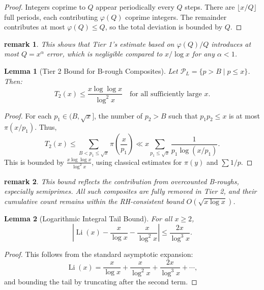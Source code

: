 \documentclass[11pt]{article}
\newtheorem{lemma}{Lemma}
\newtheorem{remark}{remark}
\begin{document}
	\begin{proof}
		Integers coprime to \( Q \) appear periodically every \( Q \) steps. There are \( \lfloor x / Q \rfloor \) full periods, each contributing \( \varphi(Q) \) coprime integers. The remainder contributes at most \( \varphi(Q) \le Q \), so the total deviation is bounded by \( Q \).
	\end{proof}
	
	\begin{remark}
		This shows that Tier 1’s estimate based on \( \varphi(Q)/Q \) introduces at most \( Q = x^\alpha \) error, which is negligible compared to \( x/\log x \) for any \( \alpha < 1 \).
	\end{remark}
	
	\begin{lemma}[Tier 2 Bound for B-rough Composites]
		Let \( \mathcal{P}_L = \{ p > B \mid p \le x \} \). Then:
		\[
		T_2(x) \le \frac{x \log \log x}{\log^2 x}
		\quad \text{for all sufficiently large } x.
		\]
	\end{lemma}
	
	\begin{proof}
		For each \( p_1 \in (B, \sqrt{x}] \), the number of \( p_2 > B \) such that \( p_1 p_2 \le x \) is at most \( \pi(x/p_1) \). Thus,
		\[
		T_2(x) \le \sum_{B < p_1 \le \sqrt{x}} \pi\left( \frac{x}{p_1} \right) \ll x \sum_{p_1 \le \sqrt{x}} \frac{1}{p_1 \log(x/p_1)}.
		\]
		This is bounded by \( \frac{x \log \log x}{\log^2 x} \), using classical estimates for \( \pi(y) \) and \( \sum 1/p \).
	\end{proof}
	
	\begin{remark}
		This bound reflects the contribution from overcounted B-roughs, especially semiprimes. All such composites are fully removed in Tier 2, and their cumulative count remains within the RH-consistent bound \( O(\sqrt{x \log x}) \).
	\end{remark}
	
	\begin{lemma}[Logarithmic Integral Tail Bound]
		For all \( x \ge 2 \),
		\[
		\left| \operatorname{Li}(x) - \frac{x}{\log x} - \frac{x}{\log^2 x} \right| \le \frac{2x}{\log^3 x}.
		\]
	\end{lemma}
	
	\begin{proof}
		This follows from the standard asymptotic expansion:
		\[
		\operatorname{Li}(x) = \frac{x}{\log x} + \frac{x}{\log^2 x} + \frac{2x}{\log^3 x} + \cdots,
		\]
		and bounding the tail by truncating after the second term.
	\end{proof}
	
\end{document}
